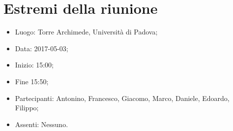 \documentclass[../verbale-2017-05-03.tex]{subfiles}
\begin{document}
\section{Estremi della riunione}
	\begin{itemize}
		\item Luogo: Torre Archimede, Università di Padova;
        \item Data: 2017-05-03;
        \item Inizio: 15:00;
        \item Fine 15:50;
		\item Partecipanti: Antonino, Francesco, Giacomo, Marco, Daniele, Edoardo, Filippo;
        \item Assenti: Nessuno.
	\end{itemize}
\end{document}
